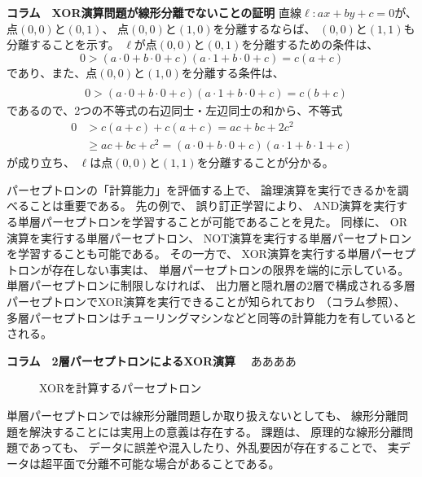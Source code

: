 \begin{itembox}{\bf コラム　XOR演算問題が線形分離でないことの証明}
  直線$\ell: ax + by + c = 0$が、点$(0, 0)$と$(0, 1)$、
  点$(0, 0)$と$(1, 0)$を分離するならば、
  $(0, 0)$と$(1, 1)$も分離することを示す。
  $\ell$が点$(0, 0)$と$(0, 1)$を分離するための条件は、
  \[
      0 > (a\cdot 0 + b\cdot 0 + c)(a\cdot 1 + b\cdot 0 + c)
      = c(a + c)
    \]
  であり、また、点$(0, 0)$と$(1, 0)$を分離する条件は、
  \begin{align*}
    &
    \\&
    0 > (a\cdot 0 + b\cdot 0 + c)(a\cdot 1 + b\cdot 0 + c)
    = c(b + c)
  \end{align*}
  であるので、2つの不等式の右辺同士・左辺同士の和から、不等式
  \begin{align*}
    0 &> c(a + c) + c(a + c)
        = ac + bc + 2c^2
    \\&
        \ge ac + bc + c^2
    = (a\cdot 0 + b\cdot 0 + c)(a\cdot 1 + b\cdot 1 + c)
  \end{align*}
  が成り立ち、
  $\ell$は点$(0, 0)$と$(1, 1)$を分離することが分かる。
\end{itembox}

パーセプトロンの「計算能力」を評価する上で、
論理演算を実行できるかを調べることは重要である。
先の例で、
誤り訂正学習により、
AND演算を実行する単層パーセプトロンを学習することが可能であることを見た。
同様に、
OR演算を実行する単層パーセプトロン、
NOT演算を実行する単層パーセプトロンを学習することも可能である。
その一方で、
XOR演算を実行する単層パーセプトロンが存在しない事実は、
単層パーセプトロンの限界を端的に示している。
単層パーセプトロンに制限しなければ、
出力層と隠れ層の2層で構成される多層パーセプトロンでXOR演算を実行できることが知られており
（コラム参照）、
多層パーセプトロンはチューリングマシンなどと同等の計算能力を有しているとされる。

\begin{itembox}{\bf コラム　2層パーセプトロンによるXOR演算}
 　ああああ
\end{itembox}

  \begin{figure}
    \centering
    
    \caption{XORを計算するパーセプトロン}
    \label{fig:xor-perceptron}
  \end{figure}


単層パーセプトロンでは線形分離問題しか取り扱えないとしても、
線形分離問題を解決することには実用上の意義は存在する。
課題は、
原理的な線形分離問題であっても、
データに誤差や混入したり、外乱要因が存在することで、
実データは超平面で分離不可能な場合があることである。

